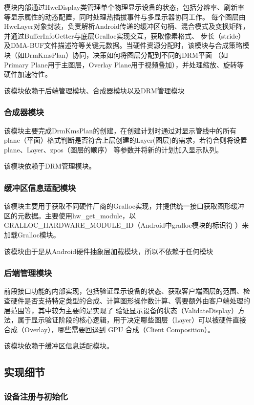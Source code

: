模块内部通过HwcDisplay类管理单个物理显示设备的状态，包括分辨率、刷新率等显示属性的动态配置，同时处理热插拔事件与多显示器协同工作。
每个图层由HwcLayer对象封装，负责解析Android传递的缓冲区句柄、混合模式及变换矩阵，并通过BufferInfoGetter与底层Gralloc实现交互，获取像素格式、
步长（stride）及DMA-BUF文件描述符等关键元数据。当硬件资源分配时，该模块与合成策略模块（如DrmKmsPlan）协同，决策如何将图层分配到不同的DRM平面
（如Primary Plane用于主图层，Overlay Plane用于视频叠加），并处理缩放、旋转等硬件加速特性。

该模块依赖于后端管理模块、合成器模块以及DRM管理模块

\subsubsection{合成器模块}
该模块主要完成DrmKmsPlan的创建，在创建计划时通过对显示管线中的所有plane（平面）格式判断是否符合上层创建的Layer(图层)的需求，若符合则将设置plane、Layer、zpos（图层的顺序）
等参数并将新的计划加入显示队列。

该模块依赖于DRM管理模块。

\subsubsection{缓冲区信息适配模块}
该模块主要用于获取不同硬件厂商的Gralloc实现，并提供统一接口获取图形缓冲区的元数据。主要使用hw\_get\_module，以GRALLOC\_HARDWARE\_MODULE\_ID（Android中gralloc模块的标识符
）来加载Gralloc模块。

该模块由于是从Android硬件抽象层加载模块，所以不依赖于任何模块

\subsubsection{后端管理模块}
前段接口功能的内部实现，包括验证显示设备的状态、获取客户端图层的范围、检查硬件是否支持特定类型的合成、计算图形操作数计算、需要额外由客户端处理的层范围等，其中较为主要的是实现了
验证显示设备的状态（ValidateDisplay）方法，属于显示验证阶段的核心逻辑，用于决定哪些图层（Layer）可以被硬件直接合成（Overlay），哪些需要回退到 GPU 合成（Client Composition）。

该模块依赖于缓冲区信息适配模块。

\subsection{实现细节}

\subsubsection{设备注册与初始化}


